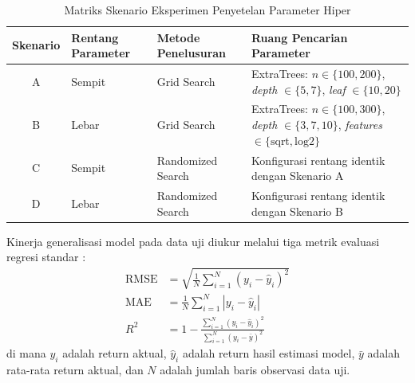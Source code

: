 \documentclass[10pt,a4paper]{article}
\begin{document}
\begin{table}[htbp]
  \centering
  \caption{Matriks Skenario Eksperimen Penyetelan Parameter Hiper}
  \label{tab:skenario_tuning}
  \fontsize{8.5pt}{11pt}\selectfont
  \begin{tabular}{clll}
    \toprule
    \textbf{Skenario} & \textbf{Rentang Parameter} & \textbf{Metode Penelusuran} & \textbf{Ruang Pencarian Parameter} \\
    \midrule
    A & Sempit & Grid Search & ExtraTrees: $n \in \{100, 200\}$, \textit{depth} $\in \{5, 7\}$, \textit{leaf} $\in \{10, 20\}$ \\
    B & Lebar & Grid Search & ExtraTrees: $n \in \{100, 300\}$, \textit{depth} $\in \{3, 7, 10\}$, \textit{features} $\in \{\text{sqrt}, \text{log2}\}$ \\
    C & Sempit & Randomized Search & Konfigurasi rentang identik dengan Skenario A \\
    D & Lebar & Randomized Search & Konfigurasi rentang identik dengan Skenario B \\
    \bottomrule
  \end{tabular}
\end{table}

Kinerja generalisasi model pada data uji diukur melalui tiga metrik evaluasi regresi standar \cite{hodson2022}:
\begin{align}
  \text{RMSE} &= \sqrt{\frac{1}{N} \sum_{i=1}^N (y_i - \hat{y}_i)^2} \label{eq:rmse} \\
  \text{MAE} &= \frac{1}{N} \sum_{i=1}^N |y_i - \hat{y}_i| \label{eq:mae} \\
  R^2 &= 1 - \frac{\sum_{i=1}^N (y_i - \hat{y}_i)^2}{\sum_{i=1}^N (y_i - \bar{y})^2} \label{eq:r2}
\end{align}
di mana $y_i$ adalah return aktual, $\hat{y}_i$ adalah return hasil estimasi model, $\bar{y}$ adalah rata-rata return aktual, dan $N$ adalah jumlah baris observasi data uji.
\end{document}
